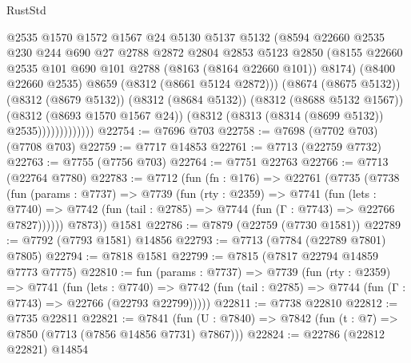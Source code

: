 \begin{lexlean}{RustStd}
\begin{coremodule}
                          @2535
                          @1570
                          @1572
                          @1567
                          @24
                          @5130
                          @5137
                          @5132
                          (@8594
                            @22660
                            @2535
                            @230
                            @244
                            @690
                            @27
                            @2788
                            @2872
                            @2804
                            @2853
                            @5123
                            @2850
                            (@8155
                              @22660
                              @2535
                              @101
                              @690
                              @101
                              @2788
                              (@8163 (@8164 @22660 @101))
                              @8174)
                            (@8400 @22660 @2535)
                            @8659
                            (@8312 (@8661 @5124 @2872)))
                          (@8674 (@8675 @5132))
                          (@8312 (@8679 @5132))
                          (@8312 (@8684 @5132))
                          (@8312 (@8688 @5132 @1567))
                          (@8312 (@8693 @1570 @1567 @24))
                          (@8312 (@8313 (@8314 (@8699 @5132)) @2535)))))))))))))
@22754 := @7696 @703
@22758 := @7698 (@7702 @703) (@7708 @703)
@22759 := @7717 @14853
@22761 := @7713 (@22759 @7732)
@22763 := @7755 (@7756 @703)
@22764 := @7751 @22763
@22766 := @7713 (@22764 @7780)
@22783 := @7712
    (fun (fn : @176) =>
    @22761
      (@7735
        (@7738
          (fun (params : @7737) =>
          @7739
            (fun (rty : @2359) =>
            @7741
              (fun (lets : @7740) =>
              @7742 (fun (tail : @2785) => @7744 (fun (Γ : @7743) => @22766 @7827))))))
        @7873))
    @1581
@22786 := @7879 (@22759 (@7730 @1581))
@22789 := @7792 (@7793 @1581) @14856
@22793 := @7713 (@7784 (@22789 @7801) @7805)
@22794 := @7818 @1581
@22799 := @7815 (@7817 @22794 @14859 @7773 @7775)
@22810 := fun (params : @7737) =>
  @7739
    (fun (rty : @2359) =>
    @7741
      (fun (lets : @7740) =>
      @7742 (fun (tail : @2785) => @7744 (fun (Γ : @7743) => @22766 (@22793 @22799)))))
@22811 := @7738 @22810
@22812 := @7735 @22811
@22821 := @7841
    (fun (U : @7840) => @7842 (fun (t : @7) => @7850 (@7713 (@7856 @14856 @7731) @7867)))
@22824 := @22786 (@22812 @22821) @14854

\end{coremodule}
\end{lexlean}
